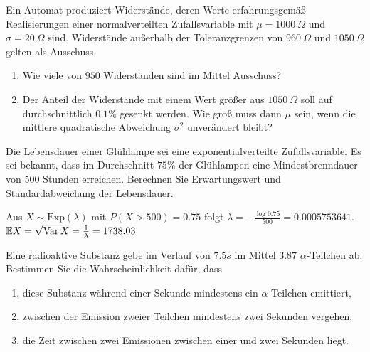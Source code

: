  Ein Automat produziert Widerstände, deren Werte
erfahrungsgemäß Realisierungen einer normalverteilten Zufallsvariable mit $\mu =
1000\ \Omega$ und $\sigma = 20\ \Omega$ sind. Widerstände außerhalb der
Toleranzgrenzen von $960\ \Omega$ und $1050\ \Omega$ gelten als Ausschuss.
\begin{enumerate}
    \item Wie viele von $950$ Widerständen sind im Mittel Ausschuss?
    \item Der Anteil der Widerstände mit einem Wert größer aus $1050\ \Omega$
        soll auf durchschnittlich $0.1\%$ gesenkt werden. Wie groß muss dann
        $\mu$ sein, wenn die mittlere quadratische Abweichung $\sigma^2$
        unverändert bleibt?
\end{enumerate}

 Die Lebensdauer einer Glühlampe sei
eine exponentialverteilte Zufallsvariable.  Es sei bekannt, dass im Durchschnitt
$75\%$ der Glühlampen eine Mindestbrenndauer von $500$ Stunden erreichen.
Berechnen Sie Erwartungswert und Standardabweichung der Lebensdauer. 

\solution Aus $X \sim \text{Exp}(\lambda)$ mit $P(X>500) = 0.75$
folgt $\lambda = - \frac{\log 0.75}{ 500} = 0.0005753641$.  $\mathbb E X = \sqrt{
\operatorname{Var} X } = \frac{1}{\lambda} = 1738.03$


 Eine radioaktive Substanz gebe im Verlauf
von $7.5 s$ im Mittel $3.87$ $\alpha$-Teilchen ab. Bestimmen Sie die
Wahrscheinlichkeit dafür, dass
\begin{enumerate}
    \item diese Substanz während einer Sekunde mindestens ein
        $\alpha$-Teilchen emittiert,
    \item zwischen der Emission zweier Teilchen mindestens zwei
        Sekunden vergehen,
    \item die Zeit zwischen zwei Emissionen zwischen einer und
        zwei Sekunden liegt.
\end{enumerate}

